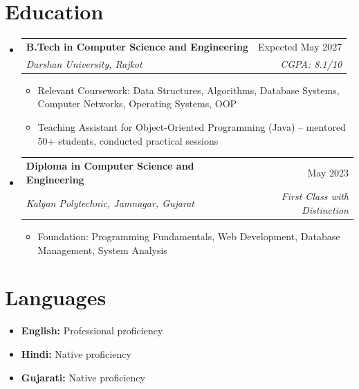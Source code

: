 \documentclass[11pt,a4paper]{article}
\makeatletter
\newcommand{\resumeSubheading}[4]{
  \vspace{-1pt}\item
    \begin{tabular*}{0.97\textwidth}[t]{l@{\extracolsep{\fill}}r}
      \textbf{#1} & #2 \\
      \textit{#3} & \textit{#4} \\
    \end{tabular*}\vspace{-3pt}
}
\newcommand{\resumeItem}[1]{
  \item\small{#1 \vspace{-1pt}}
}
\makeatother
\begin{document}
\section{Education}
\begin{itemize}[leftmargin=*]
\resumeSubheading
{B.Tech in Computer Science and Engineering}{Expected May 2027}
{Darshan University, Rajkot}{CGPA: 8.1/10}
\begin{itemize}[leftmargin=*]
\resumeItem{Relevant Coursework: Data Structures, Algorithms, Database Systems, Computer Networks, Operating Systems, OOP}
\resumeItem{Teaching Assistant for Object-Oriented Programming (Java) -- mentored 50+ students, conducted practical sessions}
\end{itemize}

\resumeSubheading
{Diploma in Computer Science and Engineering}{May 2023}
{Kalyan Polytechnic, Jamnagar, Gujarat}{First Class with Distinction}
\begin{itemize}[leftmargin=*]
\resumeItem{Foundation: Programming Fundamentals, Web Development, Database Management, System Analysis}
\end{itemize}
\end{itemize}

\section{Languages}
\begin{itemize}[leftmargin=*]
\resumeItem{\textbf{English:} Professional proficiency}
\resumeItem{\textbf{Hindi:} Native proficiency}
\resumeItem{\textbf{Gujarati:} Native proficiency}
\end{itemize}
\end{document}
